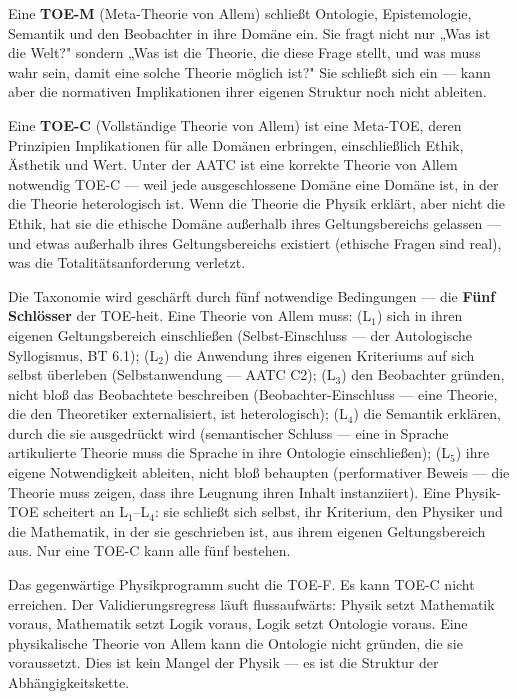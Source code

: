\documentclass[10pt, openany, oneside]{book}
\begin{document}
Eine \textbf{TOE-M} (Meta-Theorie von Allem) schließt Ontologie, Epistemologie, Semantik und den Beobachter in ihre Domäne ein. Sie fragt nicht nur „Was ist die Welt?" sondern „Was ist die Theorie, die diese Frage stellt, und was muss wahr sein, damit eine solche Theorie möglich ist?" Sie schließt sich ein --- kann aber die normativen Implikationen ihrer eigenen Struktur noch nicht ableiten.

Eine \textbf{TOE-C} (Vollständige Theorie von Allem) ist eine Meta-TOE, deren Prinzipien Implikationen für alle Domänen erbringen, einschließlich Ethik, Ästhetik und Wert. Unter der AATC ist eine korrekte Theorie von Allem notwendig TOE-C --- weil jede ausgeschlossene Domäne eine Domäne ist, in der die Theorie heterologisch ist. Wenn die Theorie die Physik erklärt, aber nicht die Ethik, hat sie die ethische Domäne außerhalb ihres Geltungsbereichs gelassen --- und etwas außerhalb ihres Geltungsbereichs existiert (ethische Fragen sind real), was die Totalitätsanforderung verletzt.

Die Taxonomie wird geschärft durch fünf notwendige Bedingungen --- die \textbf{Fünf Schlösser} der TOE-heit. Eine Theorie von Allem muss: (L$_1$) sich in ihren eigenen Geltungsbereich einschließen (Selbst-Einschluss --- der Autologische Syllogismus, BT 6.1); (L$_2$) die Anwendung ihres eigenen Kriteriums auf sich selbst überleben (Selbstanwendung --- AATC C2); (L$_3$) den Beobachter gründen, nicht bloß das Beobachtete beschreiben (Beobachter-Einschluss --- eine Theorie, die den Theoretiker externalisiert, ist heterologisch); (L$_4$) die Semantik erklären, durch die sie ausgedrückt wird (semantischer Schluss --- eine in Sprache artikulierte Theorie muss die Sprache in ihre Ontologie einschließen); (L$_5$) ihre eigene Notwendigkeit ableiten, nicht bloß behaupten (performativer Beweis --- die Theorie muss zeigen, dass ihre Leugnung ihren Inhalt instanziiert). Eine Physik-TOE scheitert an L$_1$--L$_4$: sie schließt sich selbst, ihr Kriterium, den Physiker und die Mathematik, in der sie geschrieben ist, aus ihrem eigenen Geltungsbereich aus. Nur eine TOE-C kann alle fünf bestehen.

Das gegenwärtige Physikprogramm sucht die TOE-F. Es kann TOE-C nicht erreichen. Der Validierungsregress läuft flussaufwärts: Physik setzt Mathematik voraus, Mathematik setzt Logik voraus, Logik setzt Ontologie voraus. Eine physikalische Theorie von Allem kann die Ontologie nicht gründen, die sie voraussetzt. Dies ist kein Mangel der Physik --- es ist die Struktur der Abhängigkeitskette.
\end{document}
